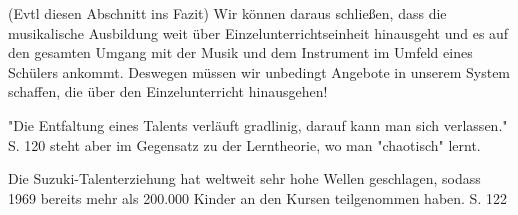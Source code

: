 (Evtl diesen Abschnitt ins Fazit)
Wir können daraus schließen, dass die musikalische Ausbildung weit über
Einzelunterrichtseinheit hinausgeht und es auf den gesamten Umgang mit der Musik
und dem Instrument im Umfeld eines Schülers ankommt. Deswegen müssen wir
unbedingt Angebote in unserem System schaffen, die über den Einzelunterricht
hinausgehen! 




"Die Entfaltung eines Talents verläuft gradlinig, darauf kann man sich
verlassen." S. 120 \autocite[120]{suzuki:erziehung_ist_liebe} steht aber im Gegensatz zu der Lerntheorie, wo man
"chaotisch" lernt.

Die Suzuki-Talenterziehung hat weltweit sehr hohe Wellen geschlagen, sodass 1969
bereits mehr als 200.000 Kinder an den Kursen teilgenommen haben. S. 122
